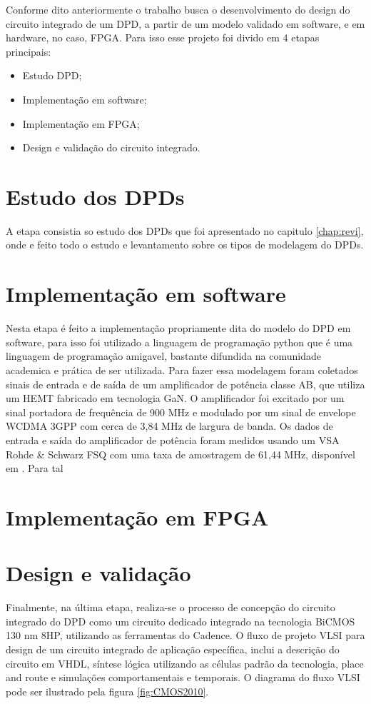 Conforme dito anteriormente o trabalho busca o desenvolvimento do design do circuito integrado de um DPD, a partir de um modelo validado em software, e em hardware, no caso, FPGA. Para isso esse projeto foi divido em 4 etapas principais:

\begin{itemize}
    \item Estudo DPD;
    \item Implementação em software;
    \item Implementação em FPGA;
    \item Design e validação do circuito integrado.
\end{itemize}

\section{Estudo dos DPDs}
A etapa consistia so estudo dos DPDs que foi apresentado no capitulo \ref{chap:revi}, onde e feito todo o estudo e levantamento sobre os tipos de modelagem do DPDs. 

\section{Implementação em software}
Nesta etapa é feito a implementação propriamente dita do modelo do DPD em software, para isso foi utilizado a linguagem de programação python que é uma linguagem de programação amigavel, bastante difundida na comunidade academica e prática de ser utilizada.
Para fazer essa modelagem foram coletados sinais de entrada e de saída de um amplificador de potência classe AB, que utiliza um HEMT fabricado em tecnologia GaN. O amplificador foi excitado por um sinal portadora de frequência de 900 MHz e modulado por um sinal de envelope WCDMA 3GPP com cerca de 3,84 MHz de largura de banda. Os dados de entrada e saída do amplificador de potência foram medidos usando um VSA Rohde \& Schwarz FSQ com uma taxa de amostragem de 61,44 MHz, disponível em \cite{Bonfim2016}.
Para tal 

\section{Implementação em FPGA}


\section{Design e validação}
Finalmente, na última etapa, realiza-se o processo de concepção do circuito integrado do DPD como um circuito dedicado integrado na tecnologia BiCMOS 130 nm 8HP, utilizando as ferramentas do Cadence.
O fluxo de projeto VLSI  para design de um circuito integrado de aplicação específica, inclui a descrição do circuito em VHDL, síntese lógica utilizando as células padrão da tecnologia, place and route e simulações comportamentais e temporais. O diagrama do fluxo VLSI pode ser ilustrado pela figura \ref{fig:CMOS2010}.


